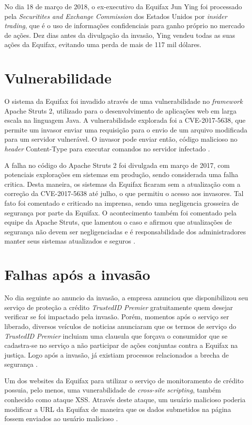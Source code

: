 \documentclass[conference]{IEEEtran}
\begin{document}
No dia 18 de março de 2018, o ex-executivo da Equifax Jun Ying foi processado pela \textit{Securitites and Exchange Commission} dos Estados Unidos por \textit{insider trading}, que é o uso de informações confidenciais
para ganho próprio no mercado de ações. Dez dias antes da divulgação da invasão, Ying vendeu todas as suas ações da Equifax, evitando uma perda de mais de 117 mil dólares. 

\section{Vulnerabilidade}
O sistema da Equifax foi invadido através de uma vulnerabilidade no \textit{framework} Apache Struts 2, utilizado para o desenvolvimento de aplicações web em larga escala na linguagem Java. A vulnerabilidade explorada
foi a CVE-2017-5638, que permite um invasor enviar uma requisição para o envio de um arquivo modificada para um servidor vulnerável. O invasor pode enviar então, código malicioso no \textit{header} Content-Type para
executar comandos no servidor infectado \cite{Luszcz2018} \cite{Sahu2017}.

A falha no código do Apache Struts 2 foi divulgada em março de 2017, com potenciais explorações em sistemas em produção, sendo considerada uma falha critica. Desta maneira, os 
sistemas da Equifax ficaram sem a atualização com a correção da CVE-2017-5638 até julho, o que permitiu o acesso aos invasores. Tal fato foi comentado e criticado na imprensa, 
sendo uma negligencia grosseira de segurança por parte da Equifax. O acontecimento também foi comentado pela equipe da Apache Struts, que lamentou o caso e afirmou que 
atualizações de segurança não devem ser negligenciadas e é responsabilidade dos administradores manter seus sistemas atualizados e seguros \cite{Newman2017} \cite{Goodin2017} 
\cite{Dignan2017} \cite{Struts2017-1} \cite{Struts2017-2}.

\section{Falhas após a invasão}
No dia seguinte ao anuncio da invasão, a empresa anunciou que disponibilizou seu serviço de proteção a crédito \textit{TrustedID Premier} gratuitamente quem desejar verificar se foi impactado pela invasão. 
Porém, momentos após o serviço ser liberado, diversos veículos de noticias anunciaram que os termos de serviço do \textit{TrustedID Premier} incluiam uma clausula que forçava o consumidor que se cadastra-se
no serviço a não participar de ações conjuntas contra a Equifax na justiça. Logo após a invasão, já existiam processos relacionados a brecha de segurança \cite{Mosendz2017} \cite{Robertson2017} \cite{Grant2017}.

Um dos websites da Equifax para utilizar o serviço de monitoramento de crédito possuia, pelo menos, uma vunerabilidade de \textit{cross-site scripting}, também conhecido como ataque XSS. Através deste ataque, um
usuário malicioso poderia modificar a URL da Equifax de maneira que os dados submetidos na página fossem enviados ao usuário malicioso \cite{Whittaker2017}.





\end{document}
